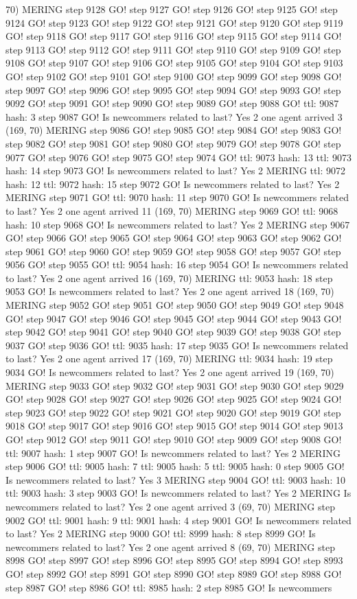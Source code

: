 70) MERING step 9128 GO! step 9127 GO! step 9126 GO! step 9125 GO! step 9124 GO! step 9123 GO! step 9122 GO! step 9121 GO! step 9120 GO! step 9119 GO! step 9118 GO! step 9117 GO! step 9116 GO! step 9115 GO! step 9114 GO! step 9113 GO! step 9112 GO! step 9111 GO! step 9110 GO! step 9109 GO! step 9108 GO! step 9107 GO! step 9106 GO! step 9105 GO! step 9104 GO! step 9103 GO! step 9102 GO! step 9101 GO! step 9100 GO! step 9099 GO! step 9098 GO! step 9097 GO! step 9096 GO! step 9095 GO! step 9094 GO! step 9093 GO! step 9092 GO! step 9091 GO! step 9090 GO! step 9089 GO! step 9088 GO! ttl: 9087 hash: 3 step 9087 GO! Is newcommers related to last? Yes 2 one agent arrived 3 (169, 70) MERING step 9086 GO! step 9085 GO! step 9084 GO! step 9083 GO! step 9082 GO! step 9081 GO! step 9080 GO! step 9079 GO! step 9078 GO! step 9077 GO! step 9076 GO! step 9075 GO! step 9074 GO! ttl: 9073 hash: 13 ttl: 9073 hash: 14 step 9073 GO! Is newcommers related to last? Yes 2 MERING ttl: 9072 hash: 12 ttl: 9072 hash: 15 step 9072 GO! Is newcommers related to last? Yes 2 MERING step 9071 GO! ttl: 9070 hash: 11 step 9070 GO! Is newcommers related to last? Yes 2 one agent arrived 11 (169, 70) MERING step 9069 GO! ttl: 9068 hash: 10 step 9068 GO! Is newcommers related to last? Yes 2 MERING step 9067 GO! step 9066 GO! step 9065 GO! step 9064 GO! step 9063 GO! step 9062 GO! step 9061 GO! step 9060 GO! step 9059 GO! step 9058 GO! step 9057 GO! step 9056 GO! step 9055 GO! ttl: 9054 hash: 16 step 9054 GO! Is newcommers related to last? Yes 2 one agent arrived 16 (169, 70) MERING ttl: 9053 hash: 18 step 9053 GO! Is newcommers related to last? Yes 2 one agent arrived 18 (169, 70) MERING step 9052 GO! step 9051 GO! step 9050 GO! step 9049 GO! step 9048 GO! step 9047 GO! step 9046 GO! step 9045 GO! step 9044 GO! step 9043 GO! step 9042 GO! step 9041 GO! step 9040 GO! step 9039 GO! step 9038 GO! step 9037 GO! step 9036 GO! ttl: 9035 hash: 17 step 9035 GO! Is newcommers related to last? Yes 2 one agent arrived 17 (169, 70) MERING ttl: 9034 hash: 19 step 9034 GO! Is newcommers related to last? Yes 2 one agent arrived 19 (169, 70) MERING step 9033 GO! step 9032 GO! step 9031 GO! step 9030 GO! step 9029 GO! step 9028 GO! step 9027 GO! step 9026 GO! step 9025 GO! step 9024 GO! step 9023 GO! step 9022 GO! step 9021 GO! step 9020 GO! step 9019 GO! step 9018 GO! step 9017 GO! step 9016 GO! step 9015 GO! step 9014 GO! step 9013 GO! step 9012 GO! step 9011 GO! step 9010 GO! step 9009 GO! step 9008 GO! ttl: 9007 hash: 1 step 9007 GO! Is newcommers related to last? Yes 2 MERING step 9006 GO! ttl: 9005 hash: 7 ttl: 9005 hash: 5 ttl: 9005 hash: 0 step 9005 GO! Is newcommers related to last? Yes 3 MERING step 9004 GO! ttl: 9003 hash: 10 ttl: 9003 hash: 3 step 9003 GO! Is newcommers related to last? Yes 2 MERING Is newcommers related to last? Yes 2 one agent arrived 3 (69, 70) MERING step 9002 GO! ttl: 9001 hash: 9 ttl: 9001 hash: 4 step 9001 GO! Is newcommers related to last? Yes 2 MERING step 9000 GO! ttl: 8999 hash: 8 step 8999 GO! Is newcommers related to last? Yes 2 one agent arrived 8 (69, 70) MERING step 8998 GO! step 8997 GO! step 8996 GO! step 8995 GO! step 8994 GO! step 8993 GO! step 8992 GO! step 8991 GO! step 8990 GO! step 8989 GO! step 8988 GO! step 8987 GO! step 8986 GO! ttl: 8985 hash: 2 step 8985 GO! Is newcommers 